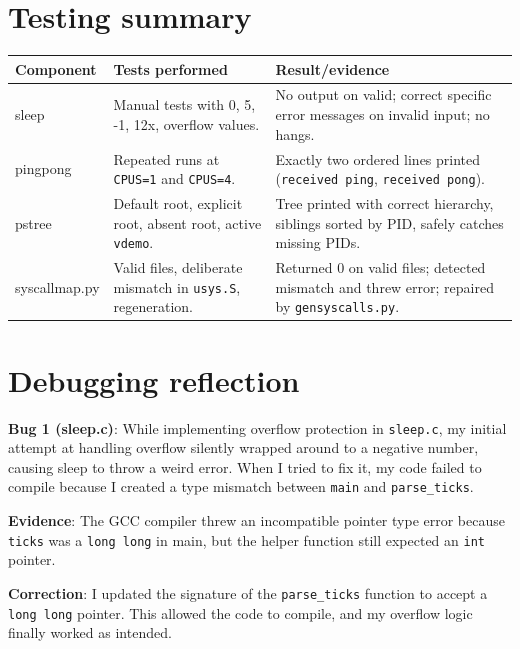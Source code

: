 \documentclass[11pt,a4paper]{article}
\begin{document}
\section*{Testing summary}
\begin{tabularx}{\textwidth}{@{}lXX@{}}
\toprule
Component & Tests performed & Result/evidence \\
\midrule
sleep & Manual tests with 0, 5, -1, 12x, overflow values. & No output on valid; correct specific error messages on invalid input; no hangs. \\
pingpong & Repeated runs at \texttt{CPUS=1} and \texttt{CPUS=4}. & Exactly two ordered lines printed (\texttt{received ping}, \texttt{received pong}). \\
pstree & Default root, explicit root, absent root, active \texttt{vdemo}. & Tree printed with correct hierarchy, siblings sorted by PID, safely catches missing PIDs. \\
syscallmap.py & Valid files, deliberate mismatch in \texttt{usys.S}, regeneration. & Returned 0 on valid files; detected mismatch and threw error; repaired by \texttt{gensyscalls.py}. \\
\bottomrule
\end{tabularx}

\section*{Debugging reflection}
\begin{sloppypar}
\textbf{Bug 1 (sleep.c)}: While implementing overflow protection in \texttt{sleep.c}, my initial attempt at handling overflow silently wrapped around to a negative number, causing sleep to throw a weird error. When I tried to fix it, my code failed to compile because I created a type mismatch between \texttt{main} and \texttt{parse\_ticks}.

\textbf{Evidence}: The GCC compiler threw an incompatible pointer type error because \texttt{ticks} was a \texttt{long long} in main, but the helper function still expected an \texttt{int} pointer.

\textbf{Correction}: I updated the signature of the \texttt{parse\_ticks} function to accept a \texttt{long long} pointer. This allowed the code to compile, and my overflow logic finally worked as intended.
\end{sloppypar}
\end{document}
